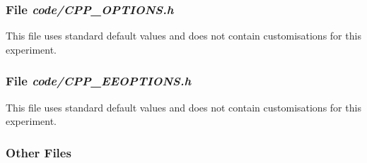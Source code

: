 \begin{small}

\end{small}

\subsubsection{File {\it code/CPP\_OPTIONS.h}}

This file uses standard default values and does not contain
customisations for this experiment.


\subsubsection{File {\it code/CPP\_EEOPTIONS.h}}

This file uses standard default values and does not contain
customisations for this experiment.

\subsubsection{Other Files }

